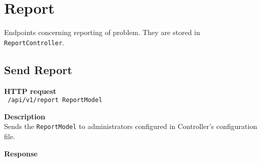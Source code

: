 \section{Report}
Endpoints concerning reporting of problem. They are stored in \texttt{ReportController}.

\subsection{Send Report}
\begin{description}
    \item \textbf{HTTP request}\\
        \texttt{\text{[POST]} /api/v1/report \texttt{ReportModel}}
    \item \textbf{Description}\\
        Sends the \texttt{ReportModel} to administrators configured in Controller's configuration file.
    \item \textbf{Response}\\
        \texttt{\text{[200 OK]}}
\end{description}